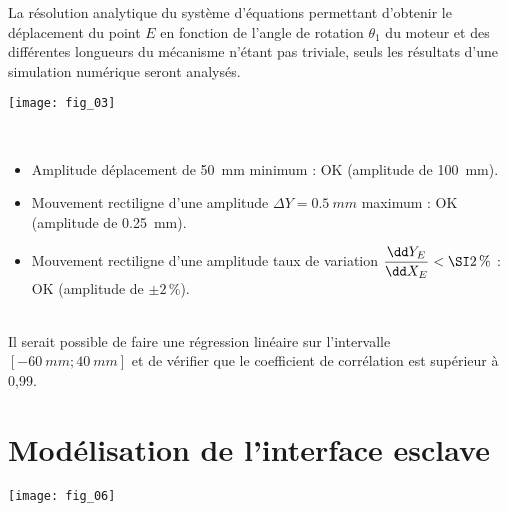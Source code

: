 \ifprof
\else

La résolution analytique du système d’équations permettant d’obtenir le déplacement du
point $E$ en fonction de l’angle de rotation $\theta_1$ du moteur et des différentes longueurs du mécanisme
n’étant pas triviale, seuls les résultats d’une simulation numérique seront analysés.

\begin{center}
\texttt{[image: fig\_03]}
\end{center}
\fi

\ifcolle
\else
{}
\ifprof
\begin{corrige}~\\
\begin{itemize}
\item Amplitude déplacement de \SI{50}{mm} minimum : OK (amplitude de \SI{100}{mm}).
\item Mouvement rectiligne d'une amplitude $\Delta Y= \SI{0,5}{mm}$ maximum : OK (amplitude de \SI{0,25}{mm}).
\item Mouvement rectiligne d'une amplitude taux de variation $\dfrac{\dd Y_E}{\dd X_E}<\SI2\,\%$  : OK  (amplitude de $\pm 2\,\%$).
\end{itemize}
\end{corrige}
\else
\fi

\ifprof
\begin{corrige}~\\
Il serait possible de faire une régression linéaire sur l'intervalle $\left[-\SI{60}{mm}; \SI{40}{mm}\right]$ et de vérifier que le coefficient de corrélation est supérieur à 0,99.
\end{corrige}
\else
\fi
\fi


\ifprof
\newpage
\else
\fi

\section*{Modélisation de l’interface esclave}
\ifprof
\else

\begin{center}
\texttt{[image: fig\_06]}
\end{center}

